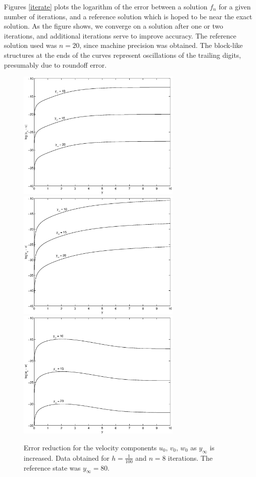 \documentclass[10pt,a4paper]{report}
\begin{document}
Figures \ref{iterate} plots the logarithm of the error between a solution $f_n$ for a given number of iterations, and a reference solution which is hoped to be near the exact solution. As the figure shows, we converge on a solution after one or two iterations, and additional iterations serve to improve accuracy. The reference solution used was $n=20$, since machine precision was obtained. The block-like structures at the ends of the curves represent oscillations of the trailing digits, presumably due to roundoff error.

\begin{figure}[ht]
\centering
\includegraphics[width=8cm]{pics/u0inf.eps}
\includegraphics[width=8cm]{pics/v0inf.eps}
\includegraphics[width=8cm]{pics/w0inf.eps}
\caption[Error reduction for $k=0$ as $y_\infty$ is increased]{Error reduction for the velocity components $u_0$, $v_0$, $w_0$ as $y_\infty$ is increased. Data obtained for $h = \frac{1}{100}$ and $n = 8$ iterations. The reference state was $y_\infty=80$.}
\label{zeroinf}
\end{figure}
\end{document}
